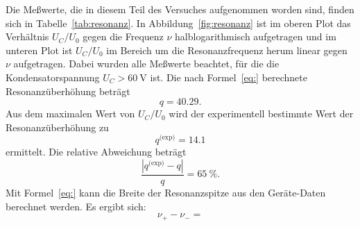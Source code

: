 Die Meßwerte, die in diesem Teil des Versuches aufgenommen worden sind,
finden sich in Tabelle~\ref{tab:resonanz}. In
Abbildung~\ref{fig:resonanz} ist im oberen Plot das Verhältnis $U_C/U_0$
gegen die Frequenz $\nu$ halblogarithmisch aufgetragen und im unteren
Plot ist $U_C/U_0$ im Bereich um die Resonanzfrequenz herum linear gegen
$\nu$ aufgetragen. Dabei wurden alle Meßwerte beachtet, für die die
Kondensatorspannung $U_C > \SI{60}{\volt}$ ist. Die nach
Formel~\eqref{eq:} berechnete Resonanzüberhöhung beträgt
%
\begin{equation*}
  q = \num{40.29}.
\end{equation*}
%
Aus dem maximalen Wert von $U_C/U_0$ wird der experimentell bestimmte
Wert der Resonanzüberhöhung zu
%
\begin{equation*}
  q^\text{(exp)} = \num{14.1}
\end{equation*}
%
ermittelt. Die relative Abweichung beträgt
%
\begin{equation*}
  \frac{|q^\text{(exp)} - q|}{q} = \SI{65}{\percent}.
\end{equation*}
Mit Formel~\eqref{eq:} kann die Breite der Resonanzspitze aus den
Geräte-Daten berechnet werden. Es ergibt sich:
%
\begin{equation*}
  \nu_+ - \nu_- = 
\end{equation*}

